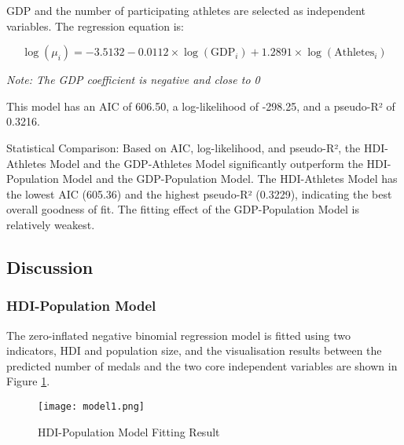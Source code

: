 \documentclass[11pt,twoside]{article}
\numberwithin{Theorem}{section}
\numberwithin{Definition}{section}
\numberwithin{Lemma}{section}
\numberwithin{Algorithm}{section}
\numberwithin{equation}{section}
\begin{document}
GDP and the number of participating athletes are selected as independent variables. The regression equation is:

\begin{equation}
\log(\mu_i) = -3.5132 - 0.0112 \times \log(\text{GDP}_i) + 1.2891 \times \log(\text{Athletes}_i)
\end{equation}

\emph{Note: The GDP coefficient is negative and close to 0}

This model has an AIC of 606.50, a log-likelihood of -298.25, and a pseudo-R² of 0.3216.

Statistical Comparison: Based on AIC, log-likelihood, and pseudo-R², the HDI-Athletes Model and the GDP-Athletes Model significantly outperform the HDI-Population Model and the GDP-Population Model. The HDI-Athletes Model has the lowest AIC (605.36) and the highest pseudo-R² (0.3229), indicating the best overall goodness of fit. The fitting effect of the GDP-Population Model is relatively weakest.

\subsection{Discussion}
\label{subsec:analysis}

\subsubsection{HDI-Population Model}

The zero-inflated negative binomial regression model is fitted using two indicators, HDI and population size, and the visualisation results between the predicted number of medals and the two core independent variables are shown in Figure \ref{fig:model1}.

\begin{figure}[!ht]
\centering
\texttt{[image: model1.png]}
\caption{HDI-Population Model Fitting Result}
\label{fig:model1}
\end{figure}
\end{document}
